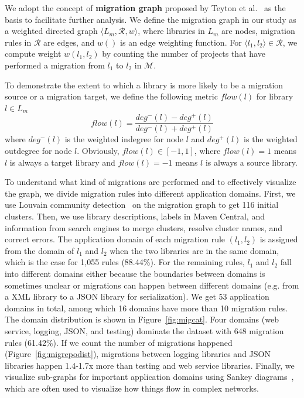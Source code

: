 \documentclass[sigconf, screen]{acmart}
\begin{document}
We adopt the concept of \textbf{migration graph} proposed by Teyton et al.~\cite{teyton2012mining, teyton2014study} as the basis to facilitate further analysis.
We define the migration graph in our study as a weighted directed graph $\langle L_m, \mathcal{R}, w \rangle$, where libraries in $L_m$ are nodes, migration rules in $\mathcal{R}$ are edges, and $w()$ is an edge weighting function.
For $\langle l_1, l_2 \rangle \in \mathcal{R}$, we compute weight $w(l_1, l_2)$ by counting the number of projects that have performed a migration from $l_1$ to $l_2$ in $\mathcal{M}$.

To demonstrate the extent to which a library is more likely to be a migration source or a migration target, we define the following metric $flow(l)$ for library $l \in L_m$
\begin{equation}
    flow(l) = \frac{deg^-(l) - deg^+(l)}{deg^-(l) + deg^+(l)}
\end{equation}
where $deg^-(l)$ is the weighted indegree for node $l$ and $deg^+(l)$ is the weighted outdegree for node $l$. 
Obviously, $flow(l) \in [-1, 1]$, where $flow(l) = 1$ means $l$ is always a target library and $flow(l) = -1$ means $l$ is always a source library.

To understand what kind of migrations are performed and to effectively visualize the graph, we divide migration rules into different application domains. 
First, we use Louvain community detection~\cite{blondel2008fast} on the migration graph to get 116 initial clusters.
Then, we use library descriptions, labels in Maven Central, and information from search engines to merge clusters, resolve cluster names, and correct errors.
The application domain of each migration rule $(l_1, l_2)$ is assigned from the domain of $l_1$ and $l_2$ when the two libraries are in the same domain, which is the case for 1,055 rules (88.44\%).
For the remaining rules, $l_1$ and $l_2$ fall into different domains either because the boundaries between domains is sometimes unclear or migrations can happen between different domains (e.g. from a XML library to a JSON library for serialization).
We get 53 application domains in total, among which 16 domains have more than 10 migration rules. 
The domain distribution is shown in Figure~\ref{fig:migcat}.
Four domains (web service, logging, JSON, and testing) dominate the dataset with 648 migration rules (61.42\%).
If we count the number of migrations happened (Figure~\ref{fig:migrepodist}), migrations between logging libraries and JSON libraries happen 1.4-1.7x more than testing and web service libraries.
Finally, we visualize sub-graphs for important application domains using Sankey diagrams~\cite{riehmann2005interactive}, which are often used to visualize how things flow in complex networks.
\end{document}
